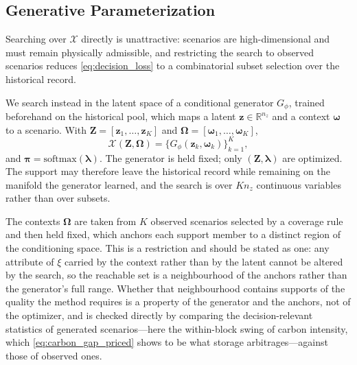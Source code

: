 \documentclass[journal]{IEEEtran}
\begin{document}
\subsection{Generative Parameterization}
\label{sec:parameterization}

Searching over $\mathcal{X}$ directly is unattractive: scenarios are
high-dimensional and must remain physically admissible, and restricting
the search to observed scenarios reduces \eqref{eq:decision_loss} to a
combinatorial subset selection over the historical record.

We search instead in the latent space of a conditional generator
$G_{\phi}$, trained beforehand on the historical pool, which maps a
latent $\boldsymbol{z}\in\mathbb{R}^{n_z}$ and a context
$\boldsymbol{\omega}$ to a scenario. With
$\boldsymbol{Z}=[\boldsymbol{z}_1,\dots,\boldsymbol{z}_K]$ and
$\boldsymbol{\Omega}=[\boldsymbol{\omega}_1,\dots,\boldsymbol{\omega}_K]$,
\begin{equation}
\mathcal{X}(\boldsymbol{Z},\boldsymbol{\Omega})
=\bigl\{G_{\phi}(\boldsymbol{z}_k,\boldsymbol{\omega}_k)\bigr\}_{k=1}^{K},
\label{eq:generated_support}
\end{equation}
and $\boldsymbol{\pi}=\mathrm{softmax}(\boldsymbol{\lambda})$. The
generator is held fixed; only $(\boldsymbol{Z},\boldsymbol{\lambda})$ are
optimized. The support may therefore leave the historical record while
remaining on the manifold the generator learned, and the search is over
$Kn_z$ continuous variables rather than over subsets.

The contexts $\boldsymbol{\Omega}$ are taken from $K$ observed scenarios
selected by a coverage rule and then held fixed, which anchors each
support member to a distinct region of the conditioning space. This is a
restriction and should be stated as one: any attribute of $\xi$ carried
by the context rather than by the latent cannot be altered by the search,
so the reachable set is a neighbourhood of the anchors rather than the
generator's full range. Whether that neighbourhood contains supports of
the quality the method requires is a property of the generator and the
anchors, not of the optimizer, and is checked directly by comparing the
decision-relevant statistics of generated scenarios---here the within-block
swing of carbon intensity, which \eqref{eq:carbon_gap_priced} shows to be
what storage arbitrages---against those of observed ones.

\end{document}
